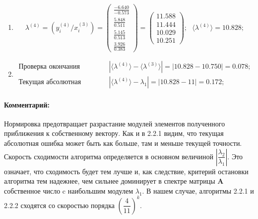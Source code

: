 \begin{enumerate}
\item $$
    \lambda^{(4)} =\left( y^{(4)}_i / x^{(3)}_i \right) =
    \begin{pmatrix} \frac{-6.640}{-0.573}\\\frac{5.848 }{0.511}\\\frac{5.145 }{0.513}\\\frac{3.926 }{0.383}\end{pmatrix}=
    \begin{pmatrix} 11.588\\11.444\\10.029\\10.251\end{pmatrix}; ~~~
    \langle\lambda^{(4)}\rangle = 10.828;$$

\item $$
    \begin{matrix}
        \text{Проверка окончания алгоритма: }&|\langle\lambda^{(4)}\rangle - \langle\lambda^{(3)}\rangle| = |10.828-10.750|     =    \mathbf{0.078};\\
        \text{Текущая абсолютная ошибка: }&|\langle\lambda^{(4)}\rangle - \lambda_1| = |10.828 - 11| = \mathbf{0.172};
    \end{matrix}$$
\end{enumerate}

\paragraph{Комментарий:} Нормировка предотвращает разрастание модулей элементов полученного приближения к собственному вектору. Как и в 2.2.1 видим, что текущая абсолютная ошибка может быть как больше, там и меньше текущей точности. Скорость сходимости алгоритма определяется в основном величиной $\left|\dfrac{\lambda_2}{\lambda_1}\right|$. Это означает, что сходимость будет тем лучше и, как следствие, критерий остановки алгоритма тем надежнее, чем сильнее доминирует в спектре матрицы $\mathbf{A}$ собственное число c наибольшим модулем $\lambda_1$. В нашем случае, алгоритмы 2.2.1 и 2.2.2 сходятся со скоростью порядка $\left(\dfrac{4}{11}\right)^k$.

